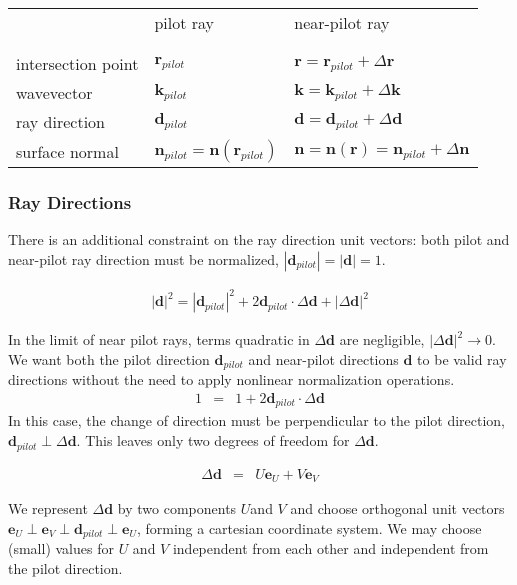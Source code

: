 \documentclass[12pt,a4paper,twoside,openright,BCOR10mm,headsepline,titlepage,abstracton,chapterprefix,final]{scrreprt}
\newcommand\Vector[1]{{\mathbf{#1}}}
\newcommand\wavenumber{k}
\newcommand\Wavevector{\Vector{\wavenumber}}
\begin{document}
\begin{tabular}{ l | l | l }
		    & pilot ray & near-pilot ray \\
& & \\ \hline & & \\
intersection point  & $\Vector{r}_{pilot}$ & ${\Vector{r}} = \Vector{r}_{pilot} + \Delta\Vector{r}$ \\
wavevector  & $\Wavevector_{pilot}$ & ${\Wavevector} = \Wavevector_{pilot} + \Delta\Wavevector$ \\
ray direction  & $\Vector{d}_{pilot}$ & ${\Vector{d}} = \Vector{d}_{pilot} + \Delta\Vector{d}$ \\
surface normal      & $\Vector{n}_{pilot} = \Vector{n}(\Vector{r}_{pilot})$ & ${\Vector{n}} = \Vector{n}({\Vector{r}}) = \Vector{n}_{pilot} + \Delta\Vector{n}$ \\
\end{tabular}

\subsubsection{Ray Directions}

There is an additional constraint on the ray direction unit vectors: both pilot and near-pilot ray direction must be normalized,
$|\Vector{d}_{pilot}|=|{\Vector{d}}|=1$.

\begin{eqnarray}
 |{\Vector{d}}|^2 = |\Vector{d}_{pilot}|^2 + 2 \Vector{d}_{pilot} \cdot \Delta\Vector{d} + |\Delta\Vector{d}|^2
\end{eqnarray}

In the limit of near pilot rays, terms quadratic in $\Delta\Vector{d}$ are negligible, $|\Delta\Vector{d}|^2 \rightarrow 0$. 
We want both the pilot direction $\Vector{d}_{pilot}$ and near-pilot directions ${\Vector{d}}$ to be valid ray directions 
without the need to apply nonlinear normalization operations.
\begin{eqnarray}
1 &=& 1 + 2 \Vector{d}_{pilot} \cdot \Delta\Vector{d}
\end{eqnarray}
In this case, the change of direction must be perpendicular to the pilot direction, $\Vector{d}_{pilot} \perp \Delta\Vector{d}$. 
This leaves only two degrees of freedom for $\Delta\Vector{d}$.

\begin{eqnarray}
 \Delta\Vector{d} &=& U \Vector{e}_{U} + V \Vector{e}_{V}
\end{eqnarray}

We represent $\Delta\Vector{d}$ by two components $U$and $V$ 
and choose orthogonal unit vectors $\Vector{e}_{U} \perp \Vector{e}_{V} \perp \Vector{d}_{pilot} \perp \Vector{e}_{U}$,
forming a cartesian coordinate system.
We may choose (small) values for $U$ and $V$ independent from each other and independent from the pilot direction. 
\end{document}
